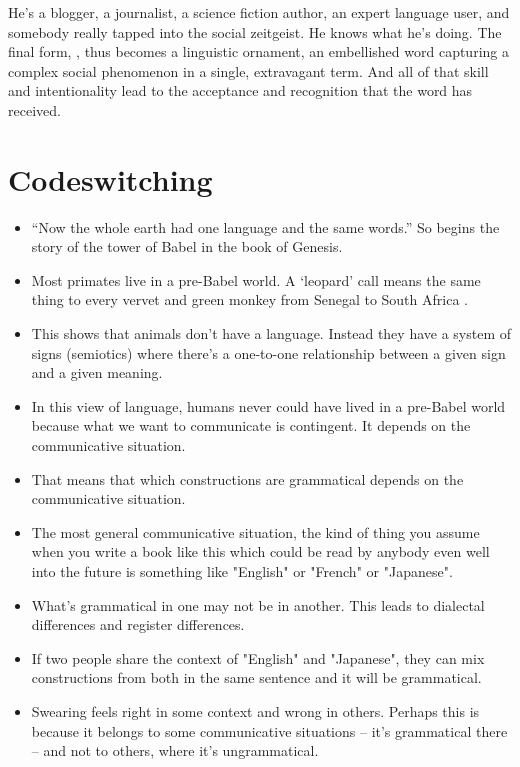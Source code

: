 He's a blogger, a journalist, a science fiction author, an expert language user, and somebody really tapped into the social zeitgeist. He knows what he's doing. The final form, , thus becomes a linguistic ornament, an embellished word capturing a complex social phenomenon in a single, extravagant term. And all of that skill and intentionality lead to the acceptance and recognition that the word has received.


\section{Codeswitching}


\begin{itemize}
    \item ``Now the whole earth had one language and the same words.'' So begins the story of the tower of Babel in the book of Genesis.
    \item Most primates live in a pre-Babel world. A `leopard' call means the same thing to every vervet and green monkey from Senegal to South Africa \citep{Price2014}.
    \item This shows that animals don't have a language. Instead they have a system of signs (semiotics) where there's a one-to-one relationship between a given sign and a given meaning.
    \item In this view of language, humans never could have lived in a pre-Babel world because what we want to communicate is contingent. It depends on the communicative situation.
    \item That means that which constructions are grammatical depends on the communicative situation.
    \item The most general communicative situation, the kind of thing you assume when you write a book like this which could be read by anybody even well into the future is something like "English" or "French" or "Japanese".
    \item What's grammatical in one may not be in another. This leads to dialectal differences and register differences.
    \item If two people share the context of "English" and "Japanese", they can mix constructions from both in the same sentence and it will be grammatical.
    \item Swearing feels right in some context and wrong in others. Perhaps this is because it belongs to some communicative situations -- it's grammatical there -- and not to others, where it's ungrammatical.
\end{itemize}






